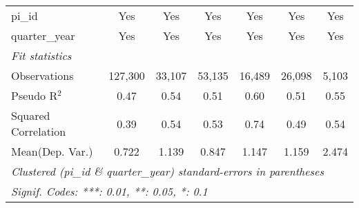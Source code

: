 \begin{tabular}{lcccccc}
   pi\_id                                                     & Yes           & Yes           & Yes            & Yes           & Yes           & Yes\\  
   quarter\_year                                              & Yes           & Yes           & Yes            & Yes           & Yes           & Yes\\  
   \midrule
   \emph{Fit statistics}\\
   Observations                                               & 127,300       & 33,107        & 53,135         & 16,489        & 26,098        & 5,103\\  
   Pseudo R$^2$                                               & 0.47          & 0.54          & 0.51           & 0.60          & 0.51          & 0.55\\  
   Squared Correlation                                        & 0.39          & 0.54          & 0.53           & 0.74          & 0.49          & 0.54\\  
Mean(Dep. Var.) & 0.722 & 1.139 & 0.847 & 1.147 & 1.159 & 2.474 \\
   \midrule \midrule
   \multicolumn{7}{l}{\emph{Clustered (pi\_id \& quarter\_year) standard-errors in parentheses}}\\
   \multicolumn{7}{l}{\emph{Signif. Codes: ***: 0.01, **: 0.05, *: 0.1}}\\
\end{tabular}
\par\endgroup
